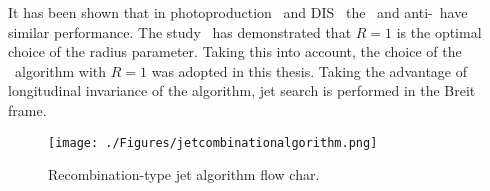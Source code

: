  It has been shown that in photoproduction~\cite{pub:incljetphp} and DIS~\cite{pub:claudia} the \kt~and anti-\kt~have similar performance. The study~\cite{pub:jetradius} has demonstrated that $R=1$ is the optimal choice of the radius parameter. Taking this into account, the choice of the \kt~algorithm with $R=1$ was adopted in this thesis. Taking the advantage of longitudinal invariance of the algorithm, jet search is performed in the Breit frame.

\begin{figure}
	\centering
		\texttt{[image: ./Figures/jetcombinationalgorithm.png]}
	\caption{Recombination-type jet algorithm flow char.}
	\label{fig:jetcombinationalgorithm}
\end{figure}
